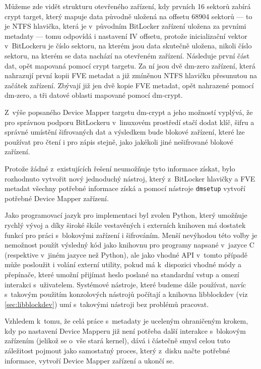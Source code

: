 Můžeme zde vidět strukturu otevřeného zařízení, kdy prvních 16 sektorů zabírá crypt target, který mapuje data původně uložená na offsetu 68904 sektorů --- to je NTFS hlavička, která je v~původním BitLocker zařízení uložena za prvními metadaty --- tomu odpovídá i nastavení IV offsetu, protože inicializační vektor v~BitLockeru je číslo sektoru, na kterém jsou data skutečně uložena, nikoli číslo sektoru, na kterém se data nachází na otevřeném zařízení. Následuje první část dat, opět mapovaná pomocí crypt targetu. Za ní jsou dvě dm-zero zařízení, která nahrazují první kopii FVE metadat a již zmíněnou NTFS hlavičku přesunutou na začátek zařízení. Zbývají již jen dvě kopie FVE metadat, opět nahrazené pomocí dm-zero, a tři datové oblasti mapované pomocí dm-crypt.

\label{sec:implementace-nastroj}

Z~výše popsaného Device Mapper targetu dm-crypt a jeho možností vyplývá, že pro správnou podporu BitLockeru v~linuxovém prostředí stačí dodat klíč, šifru a správné umístění šifrovaných dat a výsledkem bude blokové zařízení, které lze používat pro čtení i pro zápis stejně, jako jakékoli jiné nešifrované blokové zařízení.

Protože žádné z~existujících řešení neumožňuje tyto informace získat, bylo rozhodnuto vytvořit nový jednoduchý nástroj, který z~BitLocker hlavičky a FVE metadat všechny potřebné informace získá a pomocí nástroje \texttt{dmsetup} vytvoří potřebné Device Mapper zařízení.


Jako programovací jazyk pro implementaci byl zvolen Python, který umožňuje rychlý vývoj a díky široké škále vestavěných i externích knihoven má dostatek funkcí pro práci s~blokovými zařízení i šifrováním. Menší nevýhodou této volby je nemožnost použít výsledný kód jako knihovnu pro programy napsané v~jazyce C (respektive v~jiném jazyce než Python), ale jako vhodné API v~tomto případě může posloužit i volání externí utility, pokud má k~dispozici vhodné módy a přepínače, které umožní přijímat heslo poslané na standardní vstup a omezí interakci s~uživatelem. Systémové nástroje, které budeme dále používat, navíc s~takovým použitím konzolových nástrojů počítají a knihovna libblockdev (viz \ref{sec:libblockdev}) umí s~takovými nástroji bez problémů pracovat.

Vzhledem k~tomu, že celá práce s~metadaty je uceleným ohraničeným krokem, kdy po nastavení Device Mapperu již není potřeba další interakce s~blokovým zařízením (jelikož se o~vše stará kernel), dává i částečně smysl celou tuto záležitost pojmout jako samostatný proces, který z~disku načte potřebné informace, vytvoří Device Mapper zařízení a ukončí se.

